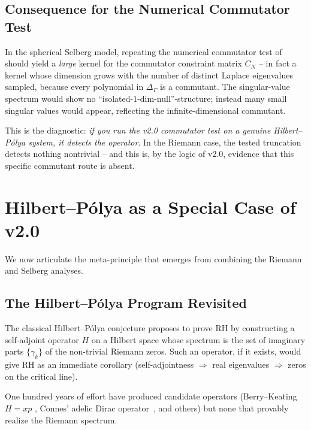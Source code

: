 \documentclass[12pt,a4paper]{article}
\theoremstyle{definition}
\theoremstyle{remark}
\newcommand{\Delop}{\Delta_{\Gamma}}
\begin{document}
\subsection{Consequence for the Numerical Commutator Test}

In the spherical Selberg model, repeating the numerical commutator test of
\cite[Section~5.3]{Geiger2026partII} should yield a \emph{large} kernel for
the commutator constraint matrix $C_N$ -- in fact a kernel whose dimension
grows with the number of distinct Laplace eigenvalues sampled, because every
polynomial in $\Delop$ is a commutant. The singular-value spectrum would show
no ``isolated-$1$-dim-null''-structure; instead many small singular values
would appear, reflecting the infinite-dimensional commutant.

This is the diagnostic: \emph{if you run the v2.0 commutator test on a
genuine Hilbert--Pólya system, it detects the operator}. In the Riemann
case, the tested truncation detects nothing nontrivial -- and this is, by the
logic of v2.0, evidence that this specific commutant route is absent.


\section{\texorpdfstring{Hilbert--Pólya as a Special Case of v2.0}{Hilbert-Pólya as a Special Case of v2.0}}
\label{sec:meta}

We now articulate the meta-principle that emerges from combining the
Riemann and Selberg analyses.

\subsection{\texorpdfstring{The Hilbert--Pólya Program Revisited}{The Hilbert-Pólya Program Revisited}}

The classical Hilbert--Pólya conjecture proposes to prove RH by constructing
a self-adjoint operator $H$ on a Hilbert space whose spectrum is the set of
imaginary parts $\{\gamma_k\}$ of the non-trivial Riemann zeros. Such an
operator, if it exists, would give RH as an immediate corollary
(self-adjointness $\Rightarrow$ real eigenvalues $\Rightarrow$ zeros on
the critical line).

One hundred years of effort have produced candidate operators (Berry--Keating
$H = xp$ \cite{BerryKeating1999}, Connes' adelic Dirac operator~\cite{Connes1999}, and others) but none that provably realize the Riemann
spectrum.
\end{document}
